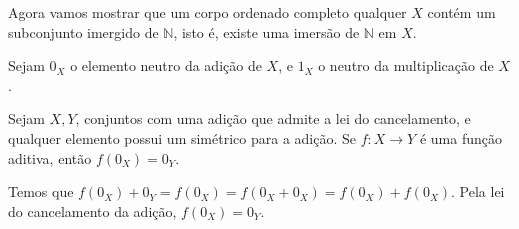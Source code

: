 \documentclass[../main.tex]{subfiles}
\begin{document}
Agora vamos mostrar que um corpo ordenado completo qualquer $X$ contém um subconjunto imergido de $\mathbb{N}$, isto é, existe uma imersão de $\mathbb{N}$ em $X$.

Sejam $0_X$ o elemento neutro da adição de $X$, e $1_X$ o neutro da multiplicação de $X$.

\begin{lema}\label{enum-lema-preservaZero}
    Sejam $X,Y$, conjuntos com uma adição que admite a lei do cancelamento, e qualquer elemento possui um simétrico para a adição. 
    Se $f \colon X \to Y$ é uma função aditiva, então $f(0_X)=0_Y$.
\end{lema}
\begin{dem}
    Temos que $f(0_X) + 0_Y = f(0_X) = f(0_X + 0_X) = f(0_X) + f(0_X)$. Pela lei do cancelamento da adição, $f(0_X) = 0_Y$. 
\end{dem}
\end{document}
